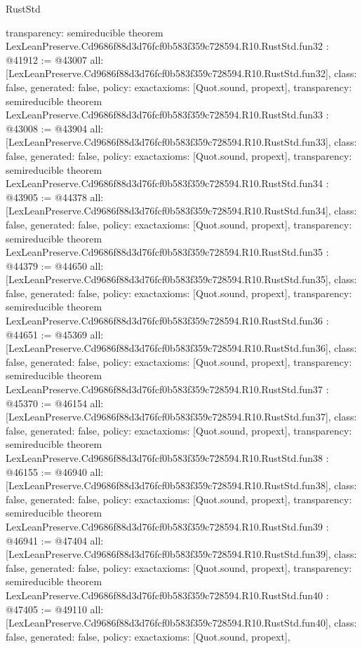\begin{lexlean}{RustStd}
\begin{coremodule}
{  transparency: semireducible
}
theorem LexLeanPreserve.Cd9686f88d3d76fcf0b583f359c728594.R10.RustStd.fun32 : @41912 := @43007 {
  all: [LexLeanPreserve.Cd9686f88d3d76fcf0b583f359c728594.R10.RustStd.fun32],
  class: false,
  generated: false,
  policy: exact{axioms: [Quot.sound, propext]},
  transparency: semireducible
}
theorem LexLeanPreserve.Cd9686f88d3d76fcf0b583f359c728594.R10.RustStd.fun33 : @43008 := @43904 {
  all: [LexLeanPreserve.Cd9686f88d3d76fcf0b583f359c728594.R10.RustStd.fun33],
  class: false,
  generated: false,
  policy: exact{axioms: [Quot.sound, propext]},
  transparency: semireducible
}
theorem LexLeanPreserve.Cd9686f88d3d76fcf0b583f359c728594.R10.RustStd.fun34 : @43905 := @44378 {
  all: [LexLeanPreserve.Cd9686f88d3d76fcf0b583f359c728594.R10.RustStd.fun34],
  class: false,
  generated: false,
  policy: exact{axioms: [Quot.sound, propext]},
  transparency: semireducible
}
theorem LexLeanPreserve.Cd9686f88d3d76fcf0b583f359c728594.R10.RustStd.fun35 : @44379 := @44650 {
  all: [LexLeanPreserve.Cd9686f88d3d76fcf0b583f359c728594.R10.RustStd.fun35],
  class: false,
  generated: false,
  policy: exact{axioms: [Quot.sound, propext]},
  transparency: semireducible
}
theorem LexLeanPreserve.Cd9686f88d3d76fcf0b583f359c728594.R10.RustStd.fun36 : @44651 := @45369 {
  all: [LexLeanPreserve.Cd9686f88d3d76fcf0b583f359c728594.R10.RustStd.fun36],
  class: false,
  generated: false,
  policy: exact{axioms: [Quot.sound, propext]},
  transparency: semireducible
}
theorem LexLeanPreserve.Cd9686f88d3d76fcf0b583f359c728594.R10.RustStd.fun37 : @45370 := @46154 {
  all: [LexLeanPreserve.Cd9686f88d3d76fcf0b583f359c728594.R10.RustStd.fun37],
  class: false,
  generated: false,
  policy: exact{axioms: [Quot.sound, propext]},
  transparency: semireducible
}
theorem LexLeanPreserve.Cd9686f88d3d76fcf0b583f359c728594.R10.RustStd.fun38 : @46155 := @46940 {
  all: [LexLeanPreserve.Cd9686f88d3d76fcf0b583f359c728594.R10.RustStd.fun38],
  class: false,
  generated: false,
  policy: exact{axioms: [Quot.sound, propext]},
  transparency: semireducible
}
theorem LexLeanPreserve.Cd9686f88d3d76fcf0b583f359c728594.R10.RustStd.fun39 : @46941 := @47404 {
  all: [LexLeanPreserve.Cd9686f88d3d76fcf0b583f359c728594.R10.RustStd.fun39],
  class: false,
  generated: false,
  policy: exact{axioms: [Quot.sound, propext]},
  transparency: semireducible
}
theorem LexLeanPreserve.Cd9686f88d3d76fcf0b583f359c728594.R10.RustStd.fun40 : @47405 := @49110 {
  all: [LexLeanPreserve.Cd9686f88d3d76fcf0b583f359c728594.R10.RustStd.fun40],
  class: false,
  generated: false,
  policy: exact{axioms: [Quot.sound, propext]},
}
\end{coremodule}
\end{lexlean}
